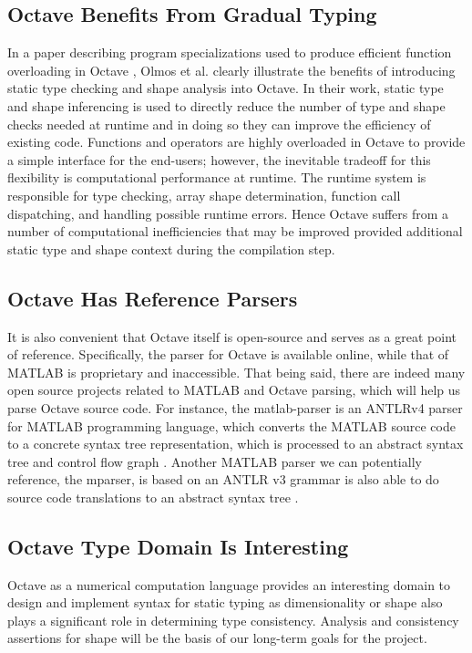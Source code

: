 \subsection{Octave Benefits From Gradual Typing}
In a paper describing program specializations used to produce efficient function overloading in Octave \cite{olmos2003turning}, Olmos et al. clearly illustrate the benefits of introducing static type checking and shape analysis into Octave. In their work, static type and shape inferencing is used to directly reduce the number of type and shape checks needed at runtime and in doing so they can improve the efficiency of existing code. Functions and operators are highly overloaded in Octave to provide a simple interface for the end-users; however, the inevitable tradeoff for this flexibility is computational performance at runtime. The runtime system is responsible for type checking, array shape determination, function call dispatching, and handling possible runtime errors. Hence Octave suffers from a number of computational inefficiencies that may be improved provided additional static type and shape context during the compilation step.

\subsection{Octave Has Reference Parsers}
It is also convenient that Octave itself is open-source and serves as a great point of reference. Specifically, the parser for Octave is available online, while that of MATLAB is proprietary and inaccessible. That being said, there are indeed many open source projects related to MATLAB and Octave parsing, which will help us parse Octave source code. For instance, the matlab-parser is an ANTLRv4 parser for MATLAB programming language, which converts the MATLAB source code to a concrete syntax tree representation, which is processed to an abstract syntax tree and control flow graph \cite{ericharley2013matlab}. Another MATLAB parser we can potentially reference, the mparser, is based on an ANTLR v3 grammar is also able to do source code translations to an abstract syntax tree \cite{ewiger2013decade}.

\subsection{Octave Type Domain Is Interesting}
Octave as a numerical computation language provides an interesting domain to design and implement syntax for static typing as dimensionality or shape also plays a significant role in determining type consistency. Analysis and consistency assertions for shape will be the basis of our long-term goals for the project.

